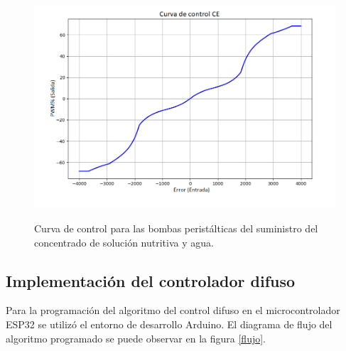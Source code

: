 \begin{figure}[H]
\centering
         \includegraphics[scale=0.6]{imgs/CurvaCE_Esp.png} \\
    \caption{Curva de control para las bombas peristálticas del suministro del concentrado de solución nutritiva y agua.}\label{conduc2}
\end{figure}

\subsection{Implementación del controlador difuso}
Para la programación del algoritmo del control difuso en el microcontrolador ESP32 se utilizó el entorno de desarrollo Arduino. El diagrama de flujo del algoritmo programado se puede observar en la figura \ref{flujo}.

